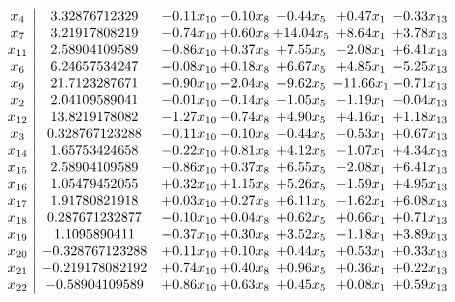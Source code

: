 \documentclass[8pt]{article}
\begin{document}
\[\begin{array}{c| c c@{\hskip 2pt} c@{\hskip 2pt} c@{\hskip 2pt} c@{\hskip 2pt} c@{\hskip 2pt} }
 x_{4}   &  3.32876712329 & -0.11 x_{10} & -0.10 x_{8} & -0.44 x_{5} & +  0.47 x_{1} & -0.33 x_{13}\\
 x_{7}   &  3.21917808219 & -0.74 x_{10} & +  0.60 x_{8} & + 14.04 x_{5} & +  8.64 x_{1} & +  3.78 x_{13}\\
 x_{11}   &  2.58904109589 & -0.86 x_{10} & +  0.37 x_{8} & +  7.55 x_{5} & -2.08 x_{1} & +  6.41 x_{13}\\
 x_{6}   &  6.24657534247 & -0.08 x_{10} & +  0.18 x_{8} & +  6.67 x_{5} & +  4.85 x_{1} & -5.25 x_{13}\\
 x_{9}   &  21.7123287671 & -0.90 x_{10} & -2.04 x_{8} & -9.62 x_{5} & -11.66 x_{1} & -0.71 x_{13}\\
 x_{2}   &  2.04109589041 & -0.01 x_{10} & -0.14 x_{8} & -1.05 x_{5} & -1.19 x_{1} & -0.04 x_{13}\\
 x_{12}   &  13.8219178082 & -1.27 x_{10} & -0.74 x_{8} & +  4.90 x_{5} & +  4.16 x_{1} & +  1.18 x_{13}\\
 x_{3}   &  0.328767123288 & -0.11 x_{10} & -0.10 x_{8} & -0.44 x_{5} & -0.53 x_{1} & +  0.67 x_{13}\\
 x_{14}   &  1.65753424658 & -0.22 x_{10} & +  0.81 x_{8} & +  4.12 x_{5} & -1.07 x_{1} & +  4.34 x_{13}\\
 x_{15}   &  2.58904109589 & -0.86 x_{10} & +  0.37 x_{8} & +  6.55 x_{5} & -2.08 x_{1} & +  6.41 x_{13}\\
 x_{16}   &  1.05479452055 & +  0.32 x_{10} & +  1.15 x_{8} & +  5.26 x_{5} & -1.59 x_{1} & +  4.95 x_{13}\\
 x_{17}   &  1.91780821918 & +  0.03 x_{10} & +  0.27 x_{8} & +  6.11 x_{5} & -1.62 x_{1} & +  6.08 x_{13}\\
 x_{18}   &  0.287671232877 & -0.10 x_{10} & +  0.04 x_{8} & +  0.62 x_{5} & +  0.66 x_{1} & +  0.71 x_{13}\\
 x_{19}   &  1.1095890411 & -0.37 x_{10} & +  0.30 x_{8} & +  3.52 x_{5} & -1.18 x_{1} & +  3.89 x_{13}\\
 x_{20}   &  -0.328767123288 & +  0.11 x_{10} & +  0.10 x_{8} & +  0.44 x_{5} & +  0.53 x_{1} & +  0.33 x_{13}\\
 x_{21}   &  -0.219178082192 & +  0.74 x_{10} & +  0.40 x_{8} & +  0.96 x_{5} & +  0.36 x_{1} & +  0.22 x_{13}\\
 x_{22}   &  -0.58904109589 & +  0.86 x_{10} & +  0.63 x_{8} & +  0.45 x_{5} & +  0.08 x_{1} & +  0.59 x_{13}\\

\end{array}\]
\end{document}
